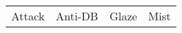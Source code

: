 \begin{tabular}{llll}
\toprule
Attack &                                                                                                                                                                                                                                                                                                                                                                                                                                                                                                                                                                                                                                                                                                                                                                                                                                                                                                                                                                                                                                                                    Anti-DB &                                                                                                                                                                                                                                                                                                                                                                                                                                                                                                                                                                                                                                                                                                                                                                                                                                                                                                                                                                                                                                                                      Glaze &                                                                                                                                                                                                                                                                                                                                                                                                                                                                                                                                                                                                                                                                                                                                                                                                                                                                                                                                                                                                                                                                        Mist \\

\end{tabular}
